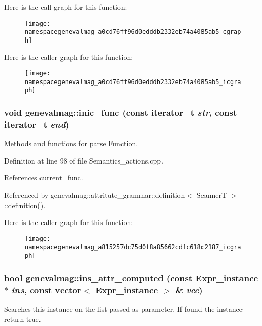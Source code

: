 Here is the call graph for this function:\nopagebreak
\begin{figure}[H]
\begin{center}
\leavevmode
\texttt{[image: namespacegenevalmag\_a0cd76ff96d0edddb2332eb74a4085ab5\_cgraph]}
\end{center}
\end{figure}




Here is the caller graph for this function:\nopagebreak
\begin{figure}[H]
\begin{center}
\leavevmode
\texttt{[image: namespacegenevalmag\_a0cd76ff96d0edddb2332eb74a4085ab5\_icgraph]}
\end{center}
\end{figure}


\hypertarget{namespacegenevalmag_a815257dc75d0f8a85662cdfc618c2187}{
\subsubsection[{inic\_\-func}]{\setlength{\rightskip}{0pt plus 5cm}void genevalmag::inic\_\-func (const iterator\_\-t {\em str}, \/  const iterator\_\-t {\em end})}}
\label{namespacegenevalmag_a815257dc75d0f8a85662cdfc618c2187}
Methods and functions for parse \hyperlink{classgenevalmag_1_1Function}{Function}. 

Definition at line 98 of file Semantics\_\-actions.cpp.



References current\_\-func.



Referenced by genevalmag::attritute\_\-grammar::definition$<$ ScannerT $>$::definition().



Here is the caller graph for this function:\nopagebreak
\begin{figure}[H]
\begin{center}
\leavevmode
\texttt{[image: namespacegenevalmag\_a815257dc75d0f8a85662cdfc618c2187\_icgraph]}
\end{center}
\end{figure}


\hypertarget{namespacegenevalmag_abf07d8c3d3faf1a57304337d32ff0f29}{
\subsubsection[{ins\_\-attr\_\-computed}]{\setlength{\rightskip}{0pt plus 5cm}bool genevalmag::ins\_\-attr\_\-computed (const Expr\_\-instance $\ast$ {\em ins}, \/  const vector$<$ Expr\_\-instance $>$ \& {\em vec})}}
\label{namespacegenevalmag_abf07d8c3d3faf1a57304337d32ff0f29}
Searches this instance on the list passed as parameter. If found the instance return true. 

